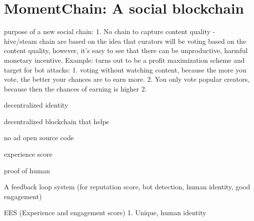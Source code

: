 \documentclass[a4paper]{article}
\begin{document}
    
\section{MomentChain: A social blockchain}
purpose of a new social chain:
1. No chain to capture content quality - hive/steam chain are based on the idea that curators will be voting based on the content quality, however, it's easy to see that there can be unproductive, harmful monetary incentive. 
   Example: turns out to be a profit maximization scheme and target for bot attacks: 
   1. voting without watching content, because the more you vote, the better your chances are to earn more. 
   2. You only vote popular creators, because then the chances of earning is higher 
2. 

decentralized identity



decentralized blockchain that helps 

no ad
open source code


    
experience score


proof of human


A feedback loop system (for reputation score, bot detection, human identity, good engagement)

EES (Experience and engagement score)
  1. Unique, human identity
 
\end{document}

